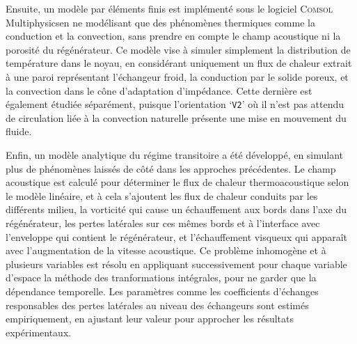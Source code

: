 Ensuite, un modèle par éléments finis est implémenté sous le logiciel \textsc{Comsol} Multiphysics\textss\textregistered en ne modélisant que des phénomènes thermiques comme la conduction et la convection, sans prendre en compte le champ acoustique ni la porosité du régénérateur. Ce modèle vise à simuler simplement la distribution de température dans le noyau, en considérant uniquement un flux de chaleur extrait à une paroi représentant l'échangeur froid, la conduction par le solide poreux, et la convection dans le cône d'adaptation d'impédance. Cette dernière est également étudiée séparément, puisque l'orientation `\texttt{V2}' où il n'est pas attendu de circulation liée à la convection naturelle présente une mise en mouvement du fluide.\smallskip

Enfin, un modèle analytique du régime transitoire a été développé, en simulant plus de phénomènes laissés de côté dans les approches précédentes. Le champ acoustique est calculé pour déterminer le flux de chaleur thermoacoustique selon le modèle linéaire, et à cela s'ajoutent les flux de chaleur conduits par les différents milieu, la vorticité qui cause un échauffement aux bords dans l'axe du régénérateur, les pertes latérales sur ces mêmes bords et à l'interface avec l'enveloppe qui contient le régénérateur, et l'échauffement visqueux qui apparaît avec l'augmentation de la vitesse acoustique. Ce problème inhomogène et à plusieurs variables est résolu en appliquant successivement pour chaque variable d'espace la méthode des tranformations intégrales, pour ne garder que la dépendance temporelle. Les paramètres comme les coefficients d'échanges responsables des pertes latérales au niveau des échangeurs sont estimés empiriquement, en ajustant leur valeur pour approcher les résultats expérimentaux. 
